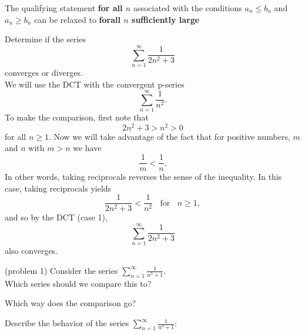 \documentclass{ximera}
\begin{document}
\begin{remark}
The qualifying statement \textbf{for all $n$} associated with the
 conditions $a_n \leq b_n$ and $ a_n \geq b_n$ can be relaxed to
  \textbf{forall $n$ sufficiently large}
\end{remark}



\begin{example}[example 1] %
Determine if the series 
\[
\sum_{n=1}^\infty \frac{1}{2n^2 + 3}
\]
converges or diverges.\\
We will use the DCT with the convergent p-series 
\[
\sum_{n=1}^\infty \frac{1}{n^2}.
\] 
To make the comparison, first note that 
\[
2n^2 + 3 > n^2 > 0
\]
 for all $n \geq 1$. Now we will take advantage of the fact that for positive numbers, $m$ and $n$ with $m>n$ we have 
 \[
 \frac{1}{m} < \frac{1}{n}.
 \]
 In other words, taking reciprocals reverses the sense of the inequality. In this case, taking reciprocals yields 
\[
\frac{1}{2n^2 + 3} < \frac{1}{n^2} \; \; \text{ for } \; \; n \geq 1,
\]
and so by the DCT (case 1), 
\[
\sum_{n=1}^\infty \frac{1}{2n^2 + 3}
\]
 also converges.
\end{example}


\begin{problem}(problem 1)
Consider the series $\displaystyle{\sum_{n=1}^\infty \frac{1}{n^3 + 1}}$.\\
Which series should we compare this to?
\begin{center}
\begin{multipleChoice}
\choice{\[\sum_{n=1}^\infty \frac{1}{n^2}\]}
\choice[correct]{\[\sum_{n=1}^\infty \frac{1}{n^3}\]}
\choice{\[\sum_{n=1}^\infty \frac{1}{3^n}\]}
\end{multipleChoice}
\end{center}

Which way does the comparison go?
\begin{center}
\begin{multipleChoice}
\end{multipleChoice}
\end{center}

Describe the behavior of the series $\displaystyle{\sum_{n=1}^\infty \frac{1}{n^3 + 1}:}$
\begin{center}
\begin{multipleChoice}
\end{multipleChoice}
\end{center}

\end{problem}
\end{document}
